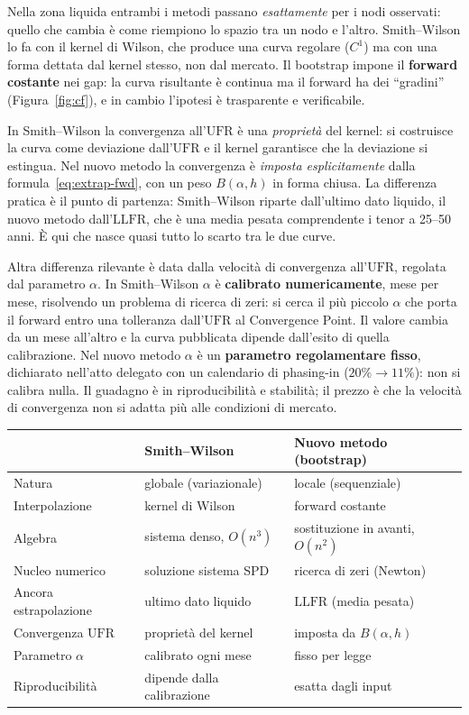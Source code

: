 \documentclass[11pt,a4paper]{article}
\theoremstyle{plain}
\theoremstyle{definition}
\theoremstyle{remark}
\newcommand{\UFR}{\mathrm{UFR}}
\newcommand{\LLFR}{\mathrm{LLFR}}
\begin{document}
Nella zona liquida entrambi i metodi passano \emph{esattamente} per i nodi osservati: quello
che cambia \`e come riempiono lo spazio tra un nodo e l'altro. Smith--Wilson lo fa con il
kernel di Wilson, che produce una curva regolare ($C^1$) ma con una forma dettata dal kernel
stesso, non dal mercato. Il bootstrap impone il \textbf{forward costante} nei gap: la curva
risultante \`e continua ma il forward ha dei ``gradini'' (Figura~\ref{fig:cf}), e in cambio
l'ipotesi \`e trasparente e verificabile.


In Smith--Wilson la convergenza all'$\UFR$ \`e una \emph{propriet\`a} del kernel: si costruisce
la curva come deviazione dall'$\UFR$ e il kernel garantisce che la deviazione si estingua.
Nel nuovo metodo la convergenza \`e \emph{imposta esplicitamente} dalla
formula~\eqref{eq:extrap-fwd}, con un peso $B(\alpha,h)$ in forma chiusa. La differenza
pratica \`e il punto di partenza: Smith--Wilson riparte dall'ultimo dato liquido, il nuovo
metodo dall'$\LLFR$, che \`e una media pesata comprendente i tenor a 25--50 anni. \`E qui che
nasce quasi tutto lo scarto tra le due curve.

Altra differenza rilevante è data dalla velocità di convergenza all'$\UFR$, regolata dal parametro $\alpha$.
 In Smith--Wilson $\alpha$ \`e
\textbf{calibrato numericamente}, mese per mese, risolvendo un problema di ricerca di zeri:
si cerca il pi\`u piccolo $\alpha$ che porta il forward entro una tolleranza dall'$\UFR$ al
Convergence Point. Il valore cambia da un mese all'altro e la curva pubblicata dipende
dall'esito di quella calibrazione. Nel nuovo metodo $\alpha$ \`e un \textbf{parametro
regolamentare fisso}, dichiarato nell'atto delegato con un calendario di phasing-in
($20\%\to11\%$): non si calibra nulla. Il guadagno \`e in riproducibilit\`a e stabilit\`a; il
prezzo \`e che la velocit\`a di convergenza non si adatta pi\`u alle condizioni di mercato.

\begin{center}
\small
\renewcommand{\arraystretch}{1.25}
\begin{tabular}{lll}
\toprule
 & \textbf{Smith--Wilson} & \textbf{Nuovo metodo (bootstrap)}\\
\midrule
\rowcolor{rowtint} Natura & globale (variazionale) & locale (sequenziale)\\
Interpolazione & kernel di Wilson & forward costante\\
\rowcolor{rowtint} Algebra & sistema denso, $O(n^3)$ & sostituzione in avanti, $O(n^2)$\\
Nucleo numerico & soluzione sistema SPD & ricerca di zeri (Newton)\\
\rowcolor{rowtint} Ancora estrapolazione & ultimo dato liquido & $\LLFR$ (media pesata)\\
Convergenza $\UFR$ & propriet\`a del kernel & imposta da $B(\alpha,h)$\\
\rowcolor{rowtint} Parametro $\alpha$ & calibrato ogni mese & fisso per legge\\
Riproducibilit\`a & dipende dalla calibrazione & esatta dagli input\\
\bottomrule
\end{tabular}
\end{center}
\end{document}
